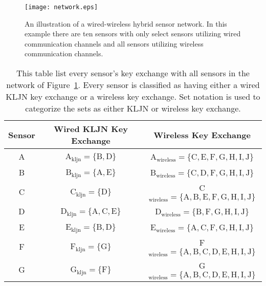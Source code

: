 \documentclass{ws-fnl2}
\begin{document}
\begin{figure}[ht]
    \label{fig:network}
\centering
\texttt{[image: network.eps]}
\vspace*{8pt}
\caption{An illustration of a wired-wireless hybrid sensor network. In this example there are ten sensors with only select sensors utilizing wired communication channels and all sensors utilizing wireless communication channels.}
\end{figure}


\begin{table}[ht]
\caption{This table list every sensor's key exchange with all sensors in the network of Figure~\ref{fig:network}. Every sensor is classified as having either a wired KLJN key exchange or a wireless key exchange. Set notation is used to categorize the sets as either KLJN or wireless key exchange. }
  \begin{center}
    \begin{tabular}{| c | c | c |}
    \hline
    Sensor & Wired KLJN Key Exchange & Wireless Key Exchange  \\
    \hline
     A & A$_\mathrm{kljn}=\{\mathrm{B},\mathrm{D}\}$ & A$_\mathrm{wireless}=\{\mathrm{C},\mathrm{E},\mathrm{F},\mathrm{G},\mathrm{H},\mathrm{I},\mathrm{J}\}$ \\
     \hline
     B & B$_\mathrm{kljn}=\{\mathrm{A},\mathrm{E}\}$ & B$_\mathrm{wireless}=\{\mathrm{C},\mathrm{D},\mathrm{F},\mathrm{G},\mathrm{H},\mathrm{I},\mathrm{J}\}$ \\
     \hline
     C & C$_\mathrm{kljn}=\{\mathrm{D}\}$  & C$_\mathrm{wireless}=\{\mathrm{A},\mathrm{B},\mathrm{E},\mathrm{F},\mathrm{G},\mathrm{H},\mathrm{I},\mathrm{J}\}$ \\
     \hline
     D & D$_\mathrm{kljn}=\{\mathrm{A},\mathrm{C}, \mathrm{E}\}$ & D$_\mathrm{wireless}=\{\mathrm{B},\mathrm{F},\mathrm{G},\mathrm{H},\mathrm{I},\mathrm{J}\}$ \\
     \hline
     E & E$_\mathrm{kljn}=\{\mathrm{B},\mathrm{D}\}$ & E$_\mathrm{wireless}=\{\mathrm{A},\mathrm{C},\mathrm{F},\mathrm{G},\mathrm{H},\mathrm{I},\mathrm{J}\}$ \\
     \hline
     F & F$_\mathrm{kljn}=\{\mathrm{G}\}$ & F$_\mathrm{wireless}=\{\mathrm{A},\mathrm{B},\mathrm{C},\mathrm{D},\mathrm{E},\mathrm{H},\mathrm{I},\mathrm{J}\}$ \\
     \hline
     G & G$_\mathrm{kljn}=\{\mathrm{F}\}$ & G$_\mathrm{wireless}=\{\mathrm{A},\mathrm{B},\mathrm{C},\mathrm{D},\mathrm{E},\mathrm{H},\mathrm{I},\mathrm{J}\}$ \\

\end{tabular}
\end{center}
\end{table}
\end{document}
